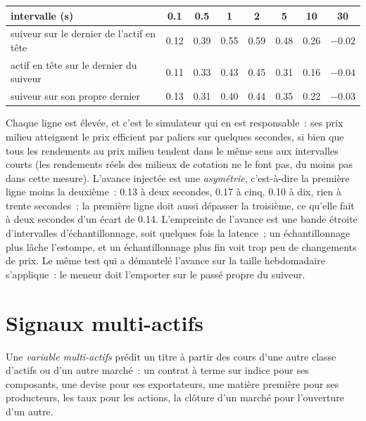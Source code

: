 \begin{center}
\small
\begin{tabular}{@{}lccccccc@{}}
\toprule
intervalle (s) & 0.1 & 0.5 & 1 & 2 & 5 & 10 & 30\\
\midrule
suiveur sur le dernier de l'actif en tête & 0.12 & 0.39 & 0.55 & 0.59 & 0.48 & 0.26 & $-0.02$\\
actif en tête sur le dernier du suiveur & 0.11 & 0.33 & 0.43 & 0.45 & 0.31 & 0.16 & $-0.04$\\
suiveur sur son propre dernier & 0.13 & 0.31 & 0.40 & 0.44 & 0.35 & 0.22 & $-0.03$\\
\bottomrule
\end{tabular}
\end{center}

Chaque ligne est élevée, et c'est le simulateur qui en est responsable~: ses prix milieu atteignent le prix efficient par paliers sur quelques secondes, si bien que tous les rendements au prix milieu
tendent dans le même sens aux intervalles courts (les rendements réels des milieux de cotation ne le font pas, du moins pas dans cette mesure). L'avance injectée est une
\emph{asymétrie}, c'est-à-dire la première ligne moins la deuxième~: 0.13 à deux secondes, 0.17 à cinq, 0.10 à dix, rien à trente secondes~;
la première ligne doit aussi dépasser la troisième, ce qu'elle fait à deux secondes d'un écart de 0.14. L'empreinte de l'avance est une bande étroite d'intervalles d'échantillonnage, soit quelques fois la latence~; un échantillonnage plus lâche l'estompe,
et un échantillonnage plus fin voit trop peu de changements de prix. Le même test qui a démantelé l'avance sur la taille hebdomadaire s'applique~: le meneur doit l'emporter
sur le passé propre du suiveur.

\section{Signaux multi-actifs}

\begin{definition}\label{def:rs:cross-sectional-and-cross-asset-features:crossasset}
Une \emph{variable multi-actifs} prédit un titre à partir des cours d'une autre classe d'actifs ou d'un autre marché~:
un contrat à terme sur indice pour ses composants, une devise pour ses exportateurs, une matière première pour ses producteurs, les taux pour les actions, la clôture d'un marché
pour l'ouverture d'un autre.
\end{definition}

